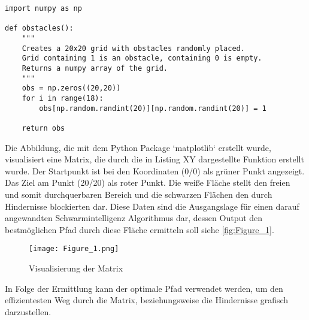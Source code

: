 \begin{verbatim}
import numpy as np

def obstacles():
    """
    Creates a 20x20 grid with obstacles randomly placed.
    Grid containing 1 is an obstacle, containing 0 is empty.
    Returns a numpy array of the grid.
    """
    obs = np.zeros((20,20))
    for i in range(18):
        obs[np.random.randint(20)][np.random.randint(20)] = 1  
  
    return obs
\end{verbatim}
\vspace*{-3mm}
\vspace*{3mm}

Die Abbildung, die mit dem Python Package `matplotlib` erstellt wurde, visualisiert eine Matrix, die durch die in Listing XY dargestellte Funktion erstellt wurde. Der Startpunkt ist bei den Koordinaten (0/0) als grüner Punkt angezeigt. Das Ziel am Punkt (20/20) als roter Punkt. Die weiße Fläche stellt den freien und somit durchquerbaren Bereich und die schwarzen Flächen den durch Hindernisse blockierten dar. Diese Daten sind die Ausgangslage für einen darauf angewandten Schwarmintelligenz Algorithmus dar, dessen Output den bestmöglichen Pfad durch diese Fläche ermitteln soll siehe \autoref{fig:Figure_1}.
\begin{figure}[H]
    \centering
    \texttt{[image: Figure\_1.png]}
    \caption{Visualisierung der Matrix}
    \label{fig:Figure_1}
\end{figure}

In Folge der Ermittlung kann der optimale Pfad verwendet werden, um den effizientesten Weg durch die Matrix, beziehungsweise die Hindernisse grafisch darzustellen.

